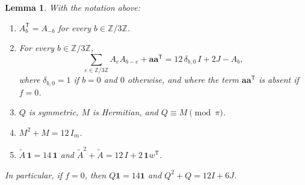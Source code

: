 \documentclass[11pt,a4paper]{article}
\newtheorem{lemma}[theorem]{Lemma}
\theoremstyle{remark}
\newcommand{\ZZ}{\mathbb{Z}}
\newcommand{\one}{\mathbf{1}}
\newcommand{\tp}{\mathsf{T}}
\newcommand{\av}{\mathbf{a}}
\newcommand{\tA}{\widetilde{A}}
\begin{document}
\begin{lemma}\label{lem:orbit}
With the notation above:
\begin{enumerate}[label=(\roman*)]
\item $A_b^{\tp}=A_{-b}$ for every $b\in\ZZ/3\ZZ$.
\item For every $b\in\ZZ/3\ZZ$,
\[
\sum_{e\in\ZZ/3\ZZ}A_eA_{b-e}+\av\av^{\tp}=12\,\delta_{b,0}\,I+2J-A_b ,
\]
where $\delta_{b,0}=1$ if $b=0$ and $0$ otherwise, and where the term $\av\av^{\tp}$ is absent if $f=0$.
\item $Q$ is symmetric, $M$ is Hermitian, and $Q\equiv M\pmod\pi$.
\item $M^2+M=12\,I_m$.
\item $\tA\,\one=14\,\one$ and $\tA^2+\tA=12\,I+2\,\one w^{\tp}$.
\end{enumerate}
In particular, if $f=0$, then $Q\one=14\one$ and $Q^2+Q=12I+6J$.
\end{lemma}
\end{document}
